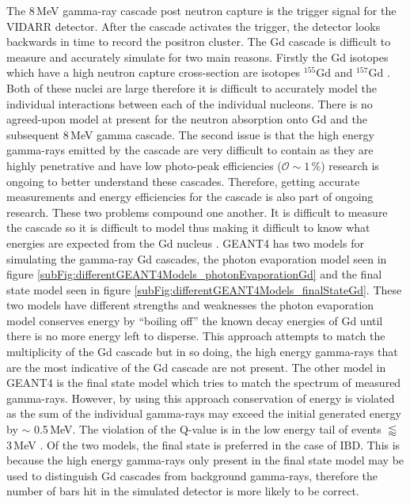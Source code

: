 The 8\,MeV gamma-ray cascade post neutron capture is the trigger signal for the VIDARR detector. After the cascade activates the trigger, the detector looks backwards in time to record the positron cluster. The Gd cascade is difficult to measure and accurately simulate for two main reasons. Firstly the Gd isotopes which have a high neutron capture cross-section are isotopes $^{155}$Gd and $^{157}$Gd \cite{molnar_2004}. Both of these nuclei are large therefore it is difficult to accurately model the individual interactions between each of the individual nucleons. There is no agreed-upon model at present for the neutron absorption onto Gd and the subsequent 8\,MeV gamma cascade. The second issue is that the high energy gamma-rays emitted by the cascade are very difficult to contain as they are highly penetrative and have low photo-peak efficiencies ($\mathcal{O} \sim 1\,\%$) research is ongoing to better understand these cascades.  Therefore, getting accurate measurements and energy efficiencies for the cascade is also part of ongoing research. These two problems compound one another. It is difficult to measure the cascade so it is difficult to model thus making it difficult to know what energies are expected from the Gd nucleus \cite{molnar_2004}. 
GEANT4 has two models for simulating the gamma-ray Gd cascades, the photon evaporation model seen in figure \ref{subFig:differentGEANT4Models_photonEvaporationGd} and the final state model seen in figure \ref{subFig:differentGEANT4Models_finalStateGd}. These two models have different strengths and weaknesses the photon evaporation model conserves energy by ``boiling off'' the known decay energies of Gd until there is no more energy left to disperse. This approach attempts to match the multiplicity of the Gd cascade but in so doing, the high energy gamma-rays that are the most indicative of the Gd cascade are not present. The other model in GEANT4 is the final state model which tries to match the spectrum of measured gamma-rays. However, by using this approach conservation of energy is violated as the sum of the individual gamma-rays may exceed the initial generated energy by $\sim$ 0.5\,MeV. The violation of the Q-value is in the low energy tail of events $\lessapprox$ 3\,MeV \cite{YuChen_2015}. Of the two models, the final state is preferred in the case of IBD. This is because the high energy gamma-rays only present in the final state model may be used to distinguish Gd cascades from background gamma-rays, therefore the number of bars hit in the simulated detector is more likely to be correct. %

